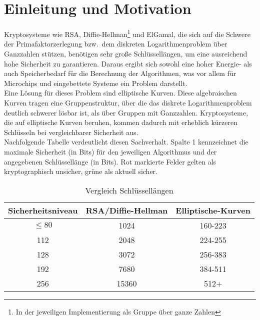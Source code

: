 \documentclass[hidelinks]{article}
\theoremstyle{plain}
\theoremstyle{definition}
\theoremstyle{rem}
\begin{document}
\begin{sloppypar}

\section{Einleitung und Motivation}
Kryptosysteme wie RSA, Diffie-Hellman\footnote{In der jeweiligen Implementierung als Gruppe über ganze Zahlen} und ElGamal\footnotemark[\value{footnote}], die sich auf die Schwere der Primafaktorzerlegung bzw.\ dem diskreten Logarithmenproblem über Ganzzahlen stützen, benötigen sehr große Schlüssellängen, um eine ausreichend hohe Sicherheit zu garantieren. 
Daraus ergibt sich sowohl eine hoher Energie- als auch Speicherbedarf für die Berechnung der Algorithmen, was vor allem für Microchips und eingebettete Systeme ein Problem darstellt.\\
Eine Lösung für dieses Problem sind elliptische Kurven. Diese algebraischen Kurven tragen eine Gruppenstruktur, über die das diskrete Logarithmenproblem deutlich schwerer lösbar ist, als über Gruppen mit Ganzzahlen.
Kryptosysteme, die auf elliptische Kurven beruhen, kommen dadurch mit erheblich kürzeren Schlüsseln bei vergleichbarer Sicherheit aus.\cite[Seite~53]{nist}\\
Nachfolgende Tabelle verdeutlicht diesen Sachverhalt. Spalte 1 kennzeichnet die maximale Sicherheit (in Bits) für den jeweiligen Algorithmus und der angegebenen Schlüssellänge (in Bits). Rot markierte Felder gelten als kryptographisch unsicher, grüne als aktuell sicher.
\begin{table}[h]
\centering
	\begin{tabular}{| c | c | c |}
	\hline
	\rowcolor{lightblue}
	Sicherheitsniveau & RSA/Diffie-Hellman\footnotemark[\value{footnote}] & Elliptische-Kurven\\ \hline
	\rowcolor{lightred}
	$\le80$ 	& 1024 & 160-223 \\ \hline
	\rowcolor{lightgreen}
	112 	& 2048 & 224-255 \\ \hline
	\rowcolor{lightgreen}
	128 	& 3072 & 256-383 \\ \hline
	\rowcolor{lightgreen}
	192 	& 7680 & 384-511 \\ \hline
	\rowcolor{lightgreen}
	256 	& 15360 & 512+ \\ \hline
	\end{tabular}
\caption{Vergleich Schlüssellängen}
\label{keylength}
\end{table}


\end{sloppypar}
\end{document}
